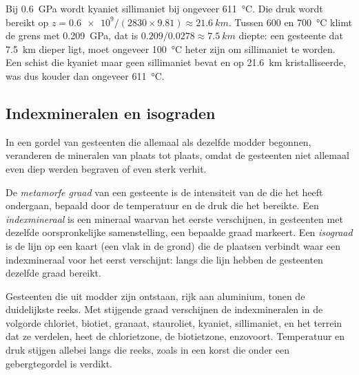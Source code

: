 \begin{example}\label{ex:g12:metamorphic-rocks:kysil}
Bij \qty{0.6}{GPa} wordt kyaniet sillimaniet bij ongeveer
\qty{611}{\celsius}. Die druk wordt bereikt op $z = \num{0.6e9} / (2830
\times 9.81) \approx \qty{21.6}{km}$. Tussen 600 en \qty{700}{\celsius}
klimt de grens met \qty{0.209}{GPa}, dat is $0.209/0.0278 \approx
\qty{7.5}{km}$ diepte: een gesteente dat \qty{7.5}{km} dieper ligt, moet ongeveer
\qty{100}{\celsius} heter zijn om sillimaniet te worden. Een schist die
kyaniet maar geen sillimaniet bevat en op \qty{21.6}{km} kristalliseerde, was dus
kouder dan ongeveer \qty{611}{\celsius}.
\end{example}

\subsection{Indexmineralen en isograden}

In een gordel van gesteenten die allemaal als dezelfde modder begonnen, veranderen de mineralen
van plaats tot plaats, omdat de gesteenten niet allemaal even diep werden begraven of even sterk
verhit.

\begin{definition}\label{def:g12:metamorphic-rocks:index-mineral}
De \emph{metamorfe graad} van een gesteente is de
intensiteit van de  die het heeft ondergaan, bepaald door de temperatuur en
de druk die het bereikte. Een \emph{indexmineraal} is een
mineraal waarvan het eerste verschijnen, in gesteenten met dezelfde oorspronkelijke samenstelling,
een bepaalde graad markeert. Een \emph{isograad} is de lijn op een kaart
(een vlak in de grond) die de plaatsen verbindt waar een indexmineraal voor het eerst
verschijnt: langs die lijn hebben de gesteenten dezelfde graad bereikt.
\end{definition}

Gesteenten die uit modder zijn ontstaan, rijk aan aluminium, tonen de duidelijkste reeks. Met
stijgende graad verschijnen de indexmineralen in de volgorde chloriet, biotiet,
granaat, stauroliet, kyaniet, sillimaniet, en het terrein dat ze verdelen,
heet de chlorietzone, de biotietzone, enzovoort. Temperatuur en
druk stijgen allebei langs die reeks, zoals in een korst die onder een
gebergtegordel is verdikt.

